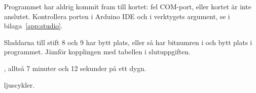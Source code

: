 Programmet har aldrig kommit fram till kortet: fel COM-port, eller kortet är inte anslutet.
Kontrollera porten i Arduino IDE och i verktygets argument, se  i
bilaga~\ref{app:studio}.

Sladdarna till stift 8 och 9 har bytt plats, eller så har bitnumren i  och
 bytt plats i programmet. Jämför kopplingen med tabellen i slutuppgiften.

\mbox{}, alltså 7 minuter och 12 sekunder på ett dygn.

\mbox{} ljuscykler.
